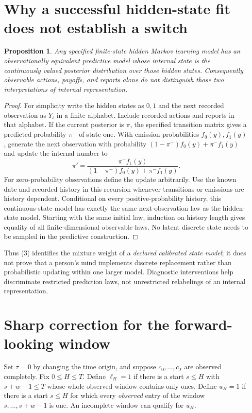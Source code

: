 \documentclass[11pt]{article}
\newtheorem{proposition}[theorem]{Proposition}
\theoremstyle{definition}
\begin{document}
\section*{Why a successful hidden-state fit does not establish a switch}
\begin{proposition}
Any specified finite-state hidden Markov learning model has an
observationally equivalent predictive model whose internal state is
the continuously valued posterior distribution over those hidden states.
Consequently observable actions, payoffs, and reports alone do not
distinguish those two interpretations of internal representation.
\end{proposition}
\begin{proof}
For simplicity write the hidden states as $0,1$ and the next recorded
observation as $Y_t$ in a finite alphabet. Include recorded actions and
reports in that alphabet. If the current posterior is $\pi$, the
specified transition matrix gives a predicted probability $\pi^-$ of
state one. With emission probabilities $f_0(y),f_1(y)$, generate the
next observation with probability
$(1-\pi^-)f_0(y)+\pi^-f_1(y)$ and update the internal number to
\[
 \pi'=
 \frac{\pi^-f_1(y)}{(1-\pi^-)f_0(y)+\pi^-f_1(y)}.         \tag{5}
\]
For zero-probability observations define the update arbitrarily.
Use the known date and recorded history in this recursion whenever
transitions or emissions are history dependent. Conditional on every
positive-probability history, this continuous-state model has exactly
the same next-observation law as the hidden-state model. Starting with
the same initial law, induction on history length gives equality of
all finite-dimensional observable laws. No latent discrete state needs
to be sampled in the predictive construction.
\end{proof}
Thus (3) identifies the mixture weight of a \emph{declared calibrated
state model}; it does not prove that a person's mind implements discrete
replacement rather than probabilistic updating within one larger model.
Diagnostic interventions help discriminate restricted prediction laws,
not unrestricted relabelings of an internal representation.

\section*{Sharp correction for the forward-looking window}
Set $\tau=0$ by changing the time origin, and suppose $c_0,\ldots,c_T$
are observed completely. Fix $0\le H\le T$. Define $\ell_H=1$ if
there is a start $s\le H$ with $s+w-1\le T$ whose whole observed
window contains only ones. Define $u_H=1$ if there is a start $s\le H$
for which every \emph{observed} entry of the window
$s,\ldots,s+w-1$ is one. An incomplete window can qualify for $u_H$.
\end{document}
